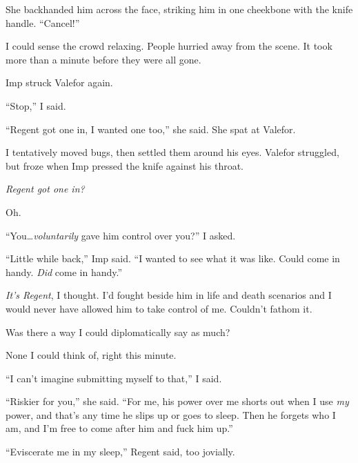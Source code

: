 She backhanded him across the face, striking him in one cheekbone with the knife handle.  ``Cancel!''



I could sense the crowd relaxing.  People hurried away from the scene.  It took more than a minute before they were all gone.



Imp struck Valefor again.



``Stop,'' I said.



``Regent got one in, I wanted one too,'' she said.  She spat at Valefor.



I tentatively moved bugs, then settled them around his eyes.  Valefor struggled, but froze when Imp pressed the knife against his throat.



\emph{Regent got one in?}



Oh.



``You\ldots \emph{voluntarily} gave him control over you?'' I asked.



``Little while back,'' Imp said.  ``I wanted to see what it was like.  Could come in handy.  \emph{Did} come in handy.''



\emph{It's Regent}, I thought.  I'd fought beside him in life and death scenarios and I would never have allowed him to take control of me.  Couldn't fathom it.



Was there a way I could diplomatically say as much?



None I could think of, right this minute.



``I can't imagine submitting myself to that,'' I said.



``Riskier for you,'' she said.  ``For me, his power over me shorts out when I use \emph{my} power, and that's any time he slips up or goes to sleep.  Then he forgets who I am, and I'm free to come after him and fuck him up.''



``Eviscerate me in my sleep,'' Regent said, too jovially.



